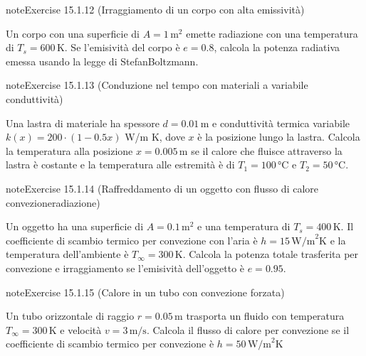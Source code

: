 \documentclass[letterpaper,10pt,italian]{jupyterBook}
\begin{document}
\begin{sphinxadmonition}{note}{Exercise 15.1.12 (Irraggiamento di un corpo con alta emissività)}



\sphinxAtStartPar
Un corpo con una superficie di \(A = 1 \, \text{m}^2\) emette radiazione con una temperatura di \(T_s = 600 \, \text{K}\). Se l’emisività del corpo è \(e = 0.8\), calcola la potenza radiativa emessa usando la legge di Stefan\sphinxhyphen{}Boltzmann.
\end{sphinxadmonition}
 \label{exercise:ch/thermodynamics/heat-transmission-problems-exercise-12}

\begin{sphinxadmonition}{note}{Exercise 15.1.13 (Conduzione nel tempo con materiali a variabile conduttività)}



\sphinxAtStartPar
Una lastra di materiale ha spessore \(d = 0.01 \, \text{m}\) e conduttività termica variabile \(k(x) = 200 \cdot (1 - 0.5x)\) W/m K, dove \(x\) è la posizione lungo la lastra. Calcola la temperatura alla posizione \(x = 0.005 \, \text{m}\) se il calore che fluisce attraverso la lastra è costante e la temperatura alle estremità è di \(T_1 = 100 \, \text{°C}\) e \(T_2 = 50 \, \text{°C}\).
\end{sphinxadmonition}
 \label{exercise:ch/thermodynamics/heat-transmission-problems-exercise-13}

\begin{sphinxadmonition}{note}{Exercise 15.1.14 (Raffreddamento di un oggetto con flusso di calore convezione\sphinxhyphen{}radiazione)}



\sphinxAtStartPar
Un oggetto ha una superficie di \(A = 0.1 \, \text{m}^2\) e una temperatura di \(T_s = 400 \, \text{K}\). Il coefficiente di scambio termico per convezione con l’aria è \(h = 15 \, \text{W/m}^2\text{K}\) e la temperatura dell’ambiente è \(T_\infty = 300 \, \text{K}\). Calcola la potenza totale trasferita per convezione e irraggiamento se l’emisività dell’oggetto è \(e = 0.95\).
\end{sphinxadmonition}
 \label{exercise:ch/thermodynamics/heat-transmission-problems-exercise-14}

\begin{sphinxadmonition}{note}{Exercise 15.1.15 (Calore in un tubo con convezione forzata)}



\sphinxAtStartPar
Un tubo orizzontale di raggio \(r = 0.05 \, \text{m}\) trasporta un fluido con temperatura \(T_\infty = 300 \, \text{K}\) e velocità \(v = 3 \, \text{m/s}\). Calcola il flusso di calore per convezione se il coefficiente di scambio termico per convezione è \(h = 50 \, \text{W/m}^2\text{K}\)
\end{sphinxadmonition}
\end{document}

